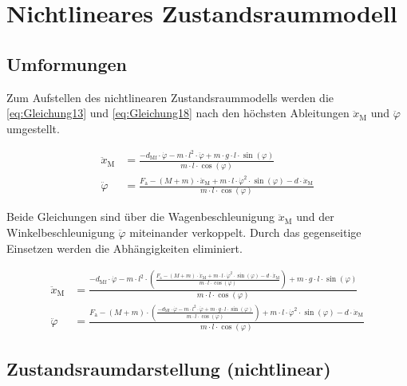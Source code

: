 \documentclass[
	pagesize,
	fontsize=12pt,
	paper=a4,
	oneside,
   reqno
]{scrartcl}
\begin{document}
\clearpage

\section{Nichtlineares Zustandsraummodell}

\subsection{Umformungen}

Zum Aufstellen des nichtlinearen Zustandsraummodells werden die \autoref{eq:Gleichung13} und \autoref{eq:Gleichung18} nach den höchsten Ableitungen $\ddot x_{\mathrm{M}}$ und $\ddot \varphi$ umgestellt.

\begin{align}
    \ddot x_{\mathrm{M}} &= \frac{-d_{\mathrm{Mf}} \cdot \dot \varphi -m \cdot l^2 \cdot \ddot \varphi + m \cdot g \cdot l \cdot \sin({\varphi})}{m \cdot l \cdot \cos({\varphi})} \label{eq:Gleichung19} \\
    \ddot \varphi &= \frac{F_{\mathrm{a}} - (M+m) \cdot \ddot x_{\mathrm{M}} + m \cdot l \cdot \dot \varphi^2 \cdot \sin({\varphi}) -d \cdot \dot x_{\mathrm{M}}}{m \cdot l \cdot \cos({\varphi})} \label{eq:Gleichung20}
\end{align}

Beide Gleichungen sind über die Wagenbeschleunigung $\ddot x_{\mathrm{M}}$ und der Winkelbeschleunigung $\ddot \varphi$ miteinander verkoppelt. Durch das gegenseitige Einsetzen werden die Abhängigkeiten eliminiert.

\begin{align}
    \ddot x_{\mathrm{M}} &= \frac{-d_{\mathrm{Mf}} \cdot \dot \varphi -m \cdot l^2 \cdot \left( \frac{F_{\mathrm{a}} - (M+m) \cdot \ddot x_{\mathrm{M}} + m \cdot l \cdot \dot \varphi^2 \cdot \sin({\varphi}) -d \cdot \dot x_{\mathrm{M}}}{m \cdot l \cdot \cos({\varphi})} \right) + m \cdot g \cdot l \cdot \sin({\varphi})}{m \cdot l \cdot \cos({\varphi})} \label{eq:Gleichung21} \\
    \ddot \varphi &= \frac{F_{\mathrm{a}} - (M+m) \cdot \left( \frac{-d_{\mathrm{Mf}} \cdot \dot \varphi -m \cdot l^2 \cdot \ddot \varphi + m \cdot g \cdot l \cdot \sin({\varphi})}{m \cdot l \cdot \cos({\varphi})} \right) + m \cdot l \cdot \dot \varphi^2 \cdot \sin({\varphi}) -d \cdot \dot x_{\mathrm{M}}}{m \cdot l \cdot \cos({\varphi})} \label{eq:Gleichung22}
\end{align}

\subsection{Zustandsraumdarstellung (nichtlinear)}
\end{document}
